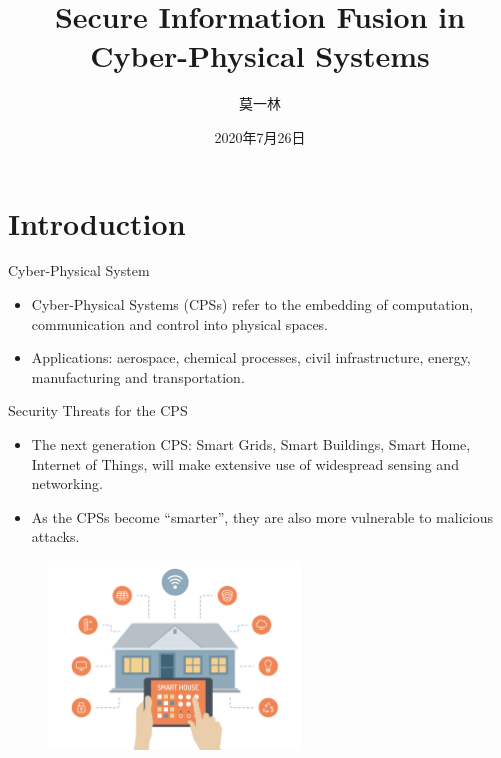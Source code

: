 \documentclass[10pt]{beamer}
\title[Secure Info Fusion]{Secure Information Fusion in Cyber-Physical Systems}
\author[Yilin Mo]{莫一林}
\institute[Tsinghua]{清华大学    自动化系}
\date[July 26, 2020]{2020年7月26日}
\begin{document}
\maketitle 

\section{Introduction}

\begin{frame}{Cyber-Physical System}
  \begin{itemize}
  \item Cyber-Physical Systems (CPSs) refer to the embedding of computation, communication and control into physical spaces.
    \begin{center}
    \end{center}
  \item Applications: aerospace, chemical processes, civil infrastructure, energy, manufacturing and transportation. 
  \end{itemize}
\end{frame}

\begin{frame}{Security Threats for the CPS}
  \begin{itemize}
  \item The next generation CPS: Smart Grids, Smart Buildings, Smart Home, Internet of Things, will make extensive use of widespread sensing and networking.
  \item As the CPSs become ``smarter'', they are also more vulnerable to malicious attacks.
  \end{itemize}
  \begin{figure}[ht]
    \centering
    \includegraphics[width=0.6\textwidth]{SmartHome.jpg}
  \end{figure}
\end{frame}
\end{document}
